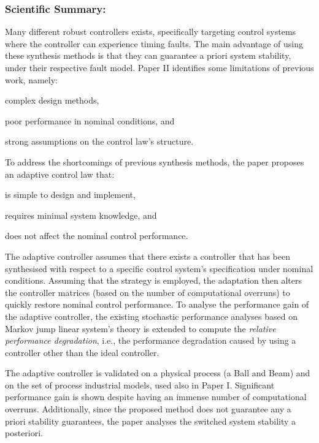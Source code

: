 \subsubsection*{Scientific Summary:}%
%
Many different robust controllers exists, specifically targeting control systems where the controller can experience timing faults.
The main advantage of using these synthesis methods is that they can guarantee a priori system stability, under their respective fault model.
Paper II identifies some limitations of previous work, namely:
\begin{enumerate*}[label=(\roman*)]
    \item complex design methods,
    \item poor performance in nominal conditions, and
    \item strong assumptions on the control law's structure.
\end{enumerate*}

To address the shortcomings of previous synthesis methods, the paper proposes an adaptive control law that:
\begin{enumerate*}[label=(\roman*)]
    \item is simple to design and implement,
    \item requires minimal system knowledge, and
    \item does not affect the nominal control performance.
\end{enumerate*}
The adaptive controller assumes that there exists a controller that has been synthesised with respect to a specific control system's specification under nominal conditions.
Assuming that the \tK{} strategy is employed, the adaptation then alters the controller matrices (based on the number of computational overruns) to quickly restore nominal control performance.
To analyse the performance gain of the adaptive controller, the existing stochastic performance analyses based on Markov jump linear system's theory is extended to compute the \emph{relative performance degradation}, i.e., the performance degradation caused by using a controller other than the ideal controller.

The adaptive controller is validated on a physical process (a Ball and Beam) and on the set of process industrial models, used also in Paper I.
Significant performance gain is shown despite having an immense number of computational overruns.
Additionally, since the proposed method does not guarantee any a priori stability guarantees, the paper analyses the switched system stability a posteriori.

